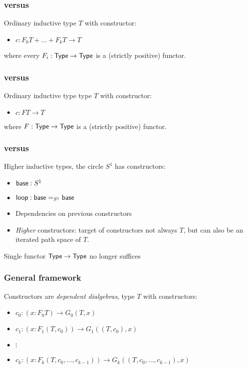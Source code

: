 \documentclass{beamer}
\begin{document}
\begin{frame}[noframenumbering]
  \frametitle{\Hits versus \oits}
Ordinary inductive type $T$ with constructor:
\begin{itemize}
  \item $c  : F_0 T + \hdots + F_k T \to T$
\end{itemize}

where every $F_i : \mathsf{Type} \to \mathsf{Type}$ is a (strictly positive) functor.
\end{frame}

\begin{frame}[noframenumbering]
  \frametitle{\Hits versus \oits}
Ordinary inductive type type $T$ with constructor:
\begin{itemize}
  \item $c  : F T \to T$
\end{itemize}

where $F : \mathsf{Type} \to \mathsf{Type}$ is a (strictly positive) functor.
\end{frame}

\begin{frame}
  \frametitle{\Hits versus \oits}
  Higher inductive types, \eg the circle $S^1$ has constructors:

  \begin{itemize}
    \item $\mathsf{base}  : S^1$
    \item $\mathsf{loop}  : \mathsf{base} =_{S^1} \mathsf{base}$
  \end{itemize}

  \begin{itemize}
  \item Dependencies on previous constructors
  \item \emph{Higher} constructors: target of constructors not always
    $T$, but can also be an iterated path space of $T$.
  \end{itemize}

  Single functor $\mathsf{Type} \to \mathsf{Type}$ no longer suffices
\end{frame}

\begin{frame}
  \frametitle{General framework}
  Constructors are \emph{dependent dialgebras}, type $T$ with constructors:

  \begin{itemize}
    \item $c_0  : (x : F_0 T) \to G_0 (T, x)$
    \item $c_1  : (x : F_1 (T, c_0)) \to G_1 ((T, c_0), x)$
    \item $\vdots$
    \item $c_k  : (x : F_k (T, c_0, \hdots, c_{k-1}))  \to G_k ((T, c_0, \hdots, c_{k-1}), x)$
  \end{itemize}


 \end{frame}
\end{document}
